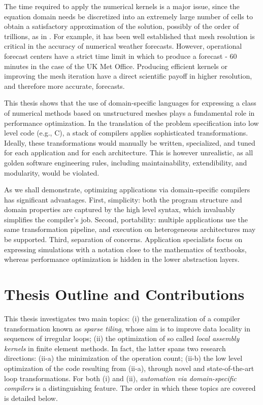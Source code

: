The time required to apply the numerical kernels is a major issue, since the equation domain needs be discretized into an extremely large number of cells to obtain a satisfactory approximation of the solution, possibly of the order of trillions, as in \cite{Rossinelli2013}. For example, it has been well established that mesh resolution is critical in the accuracy of numerical weather forecasts. However, operational forecast centers have a strict time limit in which to produce a forecast - 60 minutes in the case of the UK Met Office. Producing efficient kernels or improving the mesh iteration have a direct scientific payoff in higher resolution, and therefore more accurate, forecasts. 

This thesis shows that the use of domain-specific languages for expressing a class of numerical methods based on unstructured meshes plays a fundamental role in performance optimization. In the translation of the problem specification into low level code (e.g., C), a stack of compilers applies sophisticated transformations. Ideally, these transformations would manually be written, specialized, and tuned for each application and for each architecture. This is however unrealistic, as all golden software engineering rules, including maintainability, extendibility, and modularity, would be violated.

As we shall demonstrate, optimizing applications via domain-specific compilers has significant advantages. First, simplicity: both the program structure and domain properties are captured by the high level syntax, which invaluably simplifies the compiler's job. Second, portability: multiple applications use the same transformation pipeline, and execution on heterogeneous architectures may be supported. Third, separation of concerns. Application specialists focus on expressing simulations with a notation close to the mathematics of textbooks, whereas performance optimization is hidden in the lower abstraction layers. 

\section{Thesis Outline and Contributions}
\label{sec:contributions}
This thesis investigates two main topics: (i) the generalization of a compiler transformation known as {\em sparse tiling}, whose aim is to improve data locality in sequences of irregular loops; (ii) the optimization of so called {\em local assembly kernels} in finite element methods. In fact, the latter spans two research directions: (ii-a) the minimization of the operation count; (ii-b) the low level optimization of the code resulting from (ii-a), through novel and state-of-the-art loop transformations. For both (i) and (ii), {\it automation via domain-specific compilers} is a distinguishing feature. The order in which these topics are covered is detailed below.

